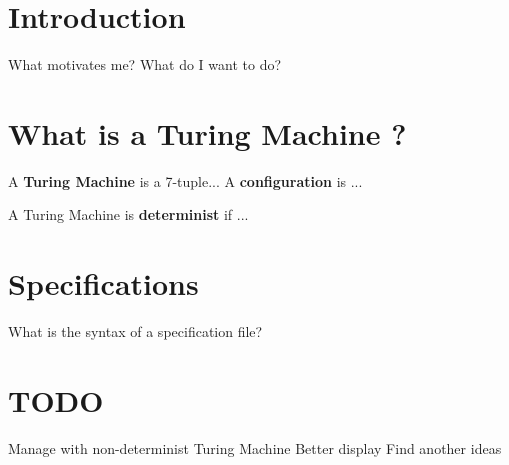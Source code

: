 \documentclass{article}
\begin{document}
\section{Introduction}
What motivates me? What do I want to do?
\section{What is a Turing Machine ?}
A \textbf{Turing Machine} is a 7-tuple...
A \textbf{configuration} is ...

A Turing Machine is \textbf{determinist} if ...

\section{Specifications}
What is the syntax of a specification file?

\section{TODO}
Manage with non-determinist Turing Machine
Better display
Find another ideas
\end{document}
